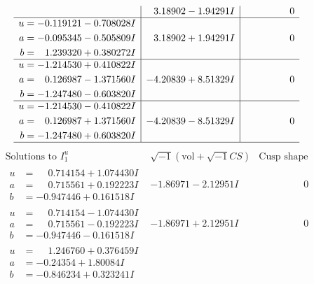 \documentclass[1p]{elsarticle_modified}
\theoremstyle{definition}
\newcommand{\I}{\sqrt{-1}}
\begin{document}
$$\begin{array}{c|c|c}
 & \phantom{-}3.18902 - 1.94291 I & \phantom{-0.000000 } 0 \\ \hline\begin{aligned}
u &= -0.119121 - 0.708028 I \\
a &= -0.095345 - 0.505809 I \\
b &= \phantom{-}1.239320 + 0.380272 I\end{aligned}
 & \phantom{-}3.18902 + 1.94291 I & \phantom{-0.000000 } 0 \\ \hline\begin{aligned}
u &= -1.214530 + 0.410822 I \\
a &= \phantom{-}0.126987 - 1.371560 I \\
b &= -1.247480 - 0.603820 I\end{aligned}
 & -4.20839 + 8.51329 I & \phantom{-0.000000 } 0 \\ \hline\begin{aligned}
u &= -1.214530 - 0.410822 I \\
a &= \phantom{-}0.126987 + 1.371560 I \\
b &= -1.247480 + 0.603820 I\end{aligned}
 & -4.20839 - 8.51329 I & \phantom{-0.000000 } 0\\
 \hline 
 \end{array}$$\newpage$$\begin{array}{c|c|c}  
\text{Solutions to }I^u_{1}& \I (\text{vol} + \sqrt{-1}CS) & \text{Cusp shape}\\
 \hline 
\begin{aligned}
u &= \phantom{-}0.714154 + 1.074430 I \\
a &= \phantom{-}0.715561 + 0.192223 I \\
b &= -0.947446 + 0.161518 I\end{aligned}
 & -1.86971 - 2.12951 I & \phantom{-0.000000 } 0 \\ \hline\begin{aligned}
u &= \phantom{-}0.714154 - 1.074430 I \\
a &= \phantom{-}0.715561 - 0.192223 I \\
b &= -0.947446 - 0.161518 I\end{aligned}
 & -1.86971 + 2.12951 I & \phantom{-0.000000 } 0 \\ \hline\begin{aligned}
u &= \phantom{-}1.246760 + 0.376459 I \\
a &= -0.24354 + 1.80084 I \\
b &= -0.846234 + 0.323241 I\end{aligned}

\end{array}$$
\end{document}
